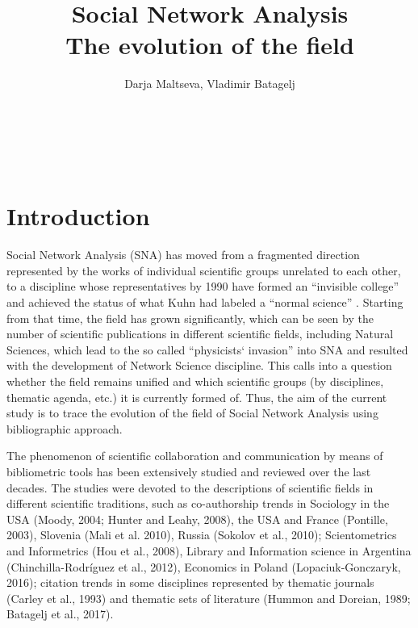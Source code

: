 \documentclass[11pt]{article} %
\title{\LARGE\textbf{Social Network Analysis}\protect\\ The evolution of the field}
\author{%
Darja Maltseva\affmark[1], Vladimir Batagelj\affmark[1,2,3]\\
\affaddr{\affmark[1]NRU HSE Moscow}\\
\affaddr{\affmark[2]IMFM Ljubljana}\\
\affaddr{\affmark[3]IAM UP Koper}\\
\email{vladimir.batagelj@fmf.uni-lj.si}\\ \email{d.maltseva@gmail.com} %
}
\begin{document}

\maketitle



\section{Introduction}

Social Network Analysis (SNA) has moved from a fragmented direction represented by the works of individual scientific groups unrelated to each other, to a discipline whose representatives by 1990 have formed an “invisible college” and achieved the status of  what Kuhn had labeled a “normal science”  \citep{SNAdev,normSci}. Starting from that time, the field has grown significantly, which can be seen by the number of scientific publications \citep{SNAinf} in different scientific fields, including Natural Sciences, which lead to the so called “physicists` invasion” into SNA \citep{Understand} and resulted with the development of Network Science discipline. This calls into a question whether the field remains unified and which scientific groups (by disciplines, thematic agenda, etc.) it is currently formed of. Thus, the aim of the current study is to trace the evolution of the field of Social Network Analysis using bibliographic approach.  \medskip 

The phenomenon of scientific collaboration and communication by means of bibliometric tools has been extensively studied and reviewed over the last decades. The studies were devoted to the descriptions of scientific fields in different scientific traditions, such as co-authorship trends in Sociology in the USA (Moody, 2004; Hunter and Leahy, 2008), the USA and France (Pontille, 2003), Slovenia (Mali et al. 2010), Russia (Sokolov et al., 2010); Scientometrics and Informetrics (Hou et al., 2008), Library and Information science in Argentina (Chinchilla-Rodríguez et al., 2012), Economics in Poland (Lopaciuk-Gonczaryk, 2016); citation trends in some disciplines represented by thematic journals (Carley et al., 1993) and thematic sets of literature (Hummon and Doreian, 1989; Batagelj et al., 2017).   \medskip 
\end{document}
